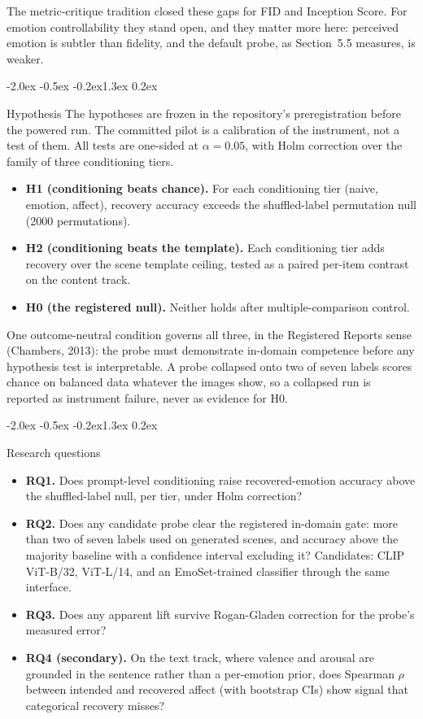 \documentclass[10pt]{article}
\makeatletter
\renewcommand\section{\@startsection{section}{1}{\z@}%
  {-2.0ex \@plus -0.5ex \@minus -0.2ex}{1.3ex \@plus 0.2ex}{\large\bfseries\raggedright}}
\makeatother
\begin{document}
The metric-critique tradition closed these gaps for FID and Inception Score. For emotion controllability they stand open, and they matter more here: perceived emotion is subtler than fidelity, and the default probe, as Section~5.5 measures, is weaker.

\section{Hypothesis}
The hypotheses are frozen in the repository's preregistration before the powered run. The committed pilot is a calibration of the instrument, not a test of them. All tests are one-sided at $\alpha=0.05$, with Holm correction over the family of three conditioning tiers.

\begin{itemize}\itemsep1pt
\item \textbf{H1 (conditioning beats chance).} For each conditioning tier (naive, emotion, affect), recovery accuracy exceeds the shuffled-label permutation null (2000 permutations).
\item \textbf{H2 (conditioning beats the template).} Each conditioning tier adds recovery over the scene template ceiling, tested as a paired per-item contrast on the content track.
\item \textbf{H0 (the registered null).} Neither holds after multiple-comparison control.
\end{itemize}

One outcome-neutral condition governs all three, in the Registered Reports sense (Chambers, 2013): the probe must demonstrate in-domain competence before any hypothesis test is interpretable. A probe collapsed onto two of seven labels scores chance on balanced data whatever the images show, so a collapsed run is reported as instrument failure, never as evidence for H0.

\section{Research questions}
\begin{itemize}\itemsep1pt
\item \textbf{RQ1.} Does prompt-level conditioning raise recovered-emotion accuracy above the shuffled-label null, per tier, under Holm correction?
\item \textbf{RQ2.} Does any candidate probe clear the registered in-domain gate: more than two of seven labels used on generated scenes, and accuracy above the majority baseline with a confidence interval excluding it? Candidates: CLIP ViT-B/32, ViT-L/14, and an EmoSet-trained classifier through the same interface.
\item \textbf{RQ3.} Does any apparent lift survive Rogan-Gladen correction for the probe's measured error?
\item \textbf{RQ4 (secondary).} On the text track, where valence and arousal are grounded in the sentence rather than a per-emotion prior, does Spearman $\rho$ between intended and recovered affect (with bootstrap CIs) show signal that categorical recovery misses?
\end{itemize}
\end{document}
